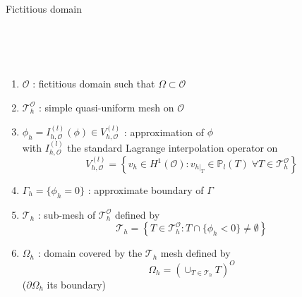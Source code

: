 \documentclass[compress,10pt,xcolor={table,dvipsnames},t]{beamer}
\begin{document}
	\begin{frame}{Fictitious domain}
		\begin{minipage}{0.39\linewidth}
			\centering
			 \\ \tiny \; \\
			 \qquad \qquad \qquad \qquad  \\
			\tiny {}
		\end{minipage}
		\begin{minipage}{0.6\linewidth}
			\begin{enumerate}[\ding{217}]
				\item $\mathcal{O}$ : fictitious domain such that $\Omega\subset\mathcal{O}$
				\item $\mathcal{T}_h^\mathcal{O}$ : simple quasi-uniform mesh on $\mathcal{O}$
				\item $\phi_h=I_{h,\mathcal{O}}^{(l)}(\phi)\in V_{h,\mathcal{O}}^{(l)}$ : approximation of $\phi$ \\ 
				with $I_{h,\mathcal{O}}^{(l)}$ the standard Lagrange interpolation operator on
				$$V_{h,\mathcal{O}}^{(l)}=\left\{v_h\in H^1(\mathcal{O}):v_{h|_T}\in\mathbb{P}_l(T) \;  \forall T\in\mathcal{T}_h^\mathcal{O}\right\}$$
				\item $\Gamma_h=\{\phi_h=0\}$ : approximate boundary of $\Gamma$
				\item $\mathcal{T}_h$ : sub-mesh of $\mathcal{T}_h^\mathcal{O}$ defined by
				$$\mathcal{T}_h=\left\{T\in \mathcal{T}_h^\mathcal{O}:T\cap\{\phi_h<0\}\ne\emptyset\right\}$$
				\item $\Omega_h$ : domain covered by the $\mathcal{T}_h$ mesh defined by
				$$\Omega_h=\left(\cup_{T\in\mathcal{T}_h}T\right)^O$$
				($\partial\Omega_h$ its boundary)
			\end{enumerate}			
		\end{minipage}
	\end{frame}
	
\end{document}
